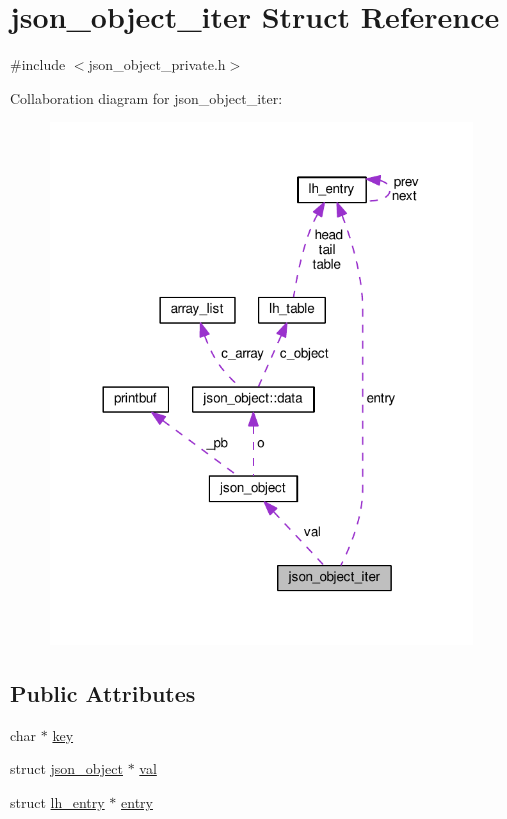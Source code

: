 \hypertarget{structjson__object__iter}{}\section{json\+\_\+object\+\_\+iter Struct Reference}
\label{structjson__object__iter}


{\ttfamily \#include $<$json\+\_\+object\+\_\+private.\+h$>$}



Collaboration diagram for json\+\_\+object\+\_\+iter\+:
\nopagebreak
\begin{figure}[H]
\begin{center}
\leavevmode
\includegraphics[width=317pt]{structjson__object__iter__coll__graph}
\end{center}
\end{figure}
\subsection*{Public Attributes}
\begin{DoxyCompactItemize}
\item 
char $\ast$ \hyperlink{structjson__object__iter_a0b76228b3a039075e9d84f88fa72ff53}{key}
\item 
struct \hyperlink{structjson__object}{json\+\_\+object} $\ast$ \hyperlink{structjson__object__iter_aaae14a8d17aacddacb0a57234e0a4491}{val}
\item 
struct \hyperlink{structlh__entry}{lh\+\_\+entry} $\ast$ \hyperlink{structjson__object__iter_a64e326f050826c644c02ed5bcd214faa}{entry}
\end{DoxyCompactItemize}


